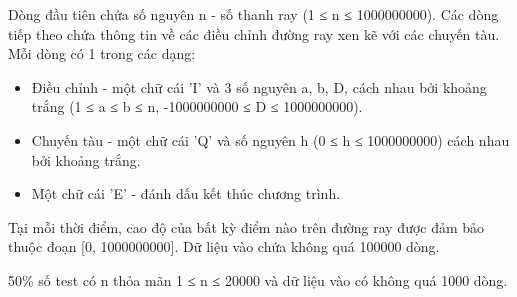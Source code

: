 Dòng đầu tiên chứa số nguyên n - số thanh ray (1 ≤ n ≤ 1000000000). Các dòng tiếp theo chứa thông tin về các điều   chỉnh đường ray xen kẽ với các chuyến tàu. Mỗi dòng có 1 trong các dạng:  
\begin{itemize}
	\item     Điều chỉnh - một chữ cái 'I' và 3 số nguyên a, b, D, cách nhau bởi khoảng trắng (1 ≤ a ≤ b ≤ n, -1000000000 ≤ D ≤   1000000000).   
	\item     Chuyến tàu - một chữ cái 'Q' và số nguyên h (0 ≤  h ≤ 1000000000) cách nhau bởi khoảng trắng.   
	\item     Một chữ cái 'E' - đánh dấu kết thúc chương trình.   
\end{itemize}

   Tại mỗi thời điểm, cao độ của bất kỳ điểm nào trên đường ray được đảm bảo thuộc đoạn [0, 1000000000]. Dữ liệu   vào chứa không quá 100000 dòng.  

   50\% số test có n thỏa mãn 1 ≤ n ≤ 20000 và dữ liệu vào có không quá 1000 dòng.